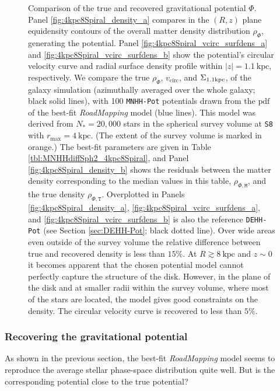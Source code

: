 \documentclass[iop,revtex4,numberedappendix,appendixfloats]{emulateapj}
\newcommand{\RM}{{\sl RoadMapping}}
\begin{document}
\begin{figure}[!htbp]
\begin{minipage}{\textwidth}
    \end{minipage}
    \caption{Comparison of the true and recovered gravitational potential $\Phi$. Panel \ref{fig:4kpc8Spiral_density_a} compares in the $(R,z)$ plane equidensity contours of the overall matter density distribution $\rho_{\Phi}$, generating the potential. Panel \ref{fig:4kpc8Spiral_vcirc_surfdens_a} and \ref{fig:4kpc8Spiral_vcirc_surfdens_b} show the potential's circular velocity curve and radial surface density profile within $|z|=1.1~\text{kpc}$, respectively. We compare the true $\rho_{\Phi}$, $v_\text{circ}$, and $\Sigma_{\rm 1.1kpc}$, of the galaxy simulation (azimuthally averaged over the whole galaxy; black solid lines), with 100 \texttt{MNHH-Pot} potentials drawn from the $\text{pdf}$ of the best-fit \RM{} model (blue lines). This model was derived from $N_*=20,000$ stars in the spherical survey volume at \texttt{S8} with $r_\text{max}=4~\text{kpc}$. (The extent of the survey volume is marked in orange.) The best-fit parameters are given in Table \ref{tbl:MNHHdiffSph2_4kpc8Spiral}, and Panel \ref{fig:4kpc8Spiral_density_b} shows the residuals between the matter density corresponding to the median values in this table, $\rho_{\Phi,\texttt{M}}$, and the true density $\rho_{\Phi,\texttt{T}}$. Overplotted in Panels \ref{fig:4kpc8Spiral_density_a}, \ref{fig:4kpc8Spiral_vcirc_surfdens_a}, and \ref{fig:4kpc8Spiral_vcirc_surfdens_b} is also the reference \texttt{DEHH-Pot} (see Section \ref{sec:DEHH-Pot}; black dotted line). Over wide areas even outside of the survey volume the relative difference between true and recovered density is less than $15\%$. At $R\gtrsim8~\text{kpc}$ and $z\sim0$ it becomes apparent that the chosen potential model cannot perfectly capture the structure of the disk. However, in the plane of the disk and at smaller radii within the survey volume, where most of the stars are located, the model gives good constraints on the density. The circular velocity curve is recovered to less than $5\%$.}
\label{fig:4kpc8Spiral_dens_vcirc_surfdens}
\end{figure}

\subsubsection{Recovering the gravitational potential} \label{sec:4kpc8Spiral_potential}

As shown in the previous section, the best-fit \RM{} model seems to reproduce the average stellar phase-space distribution quite well. But is the corresponding potential close to the true potential? 
\end{document}
